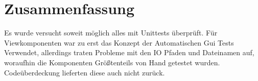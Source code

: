 \chapter{Zusammenfassung}
Es wurde versucht soweit möglich alles mit Unittests überprüft. Für Viewkomponenten war zu erst das Konzept der Automatischen Gui Tests Verwendet, allerdings traten Probleme mit den IO Pfaden und Dateinamen auf, woraufhin die Komponenten Größtenteils von Hand getestet wurden. Codeüberdeckung lieferten diese auch nicht zurück.
